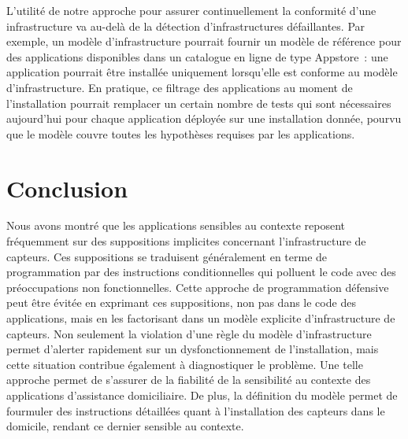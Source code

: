L'utilité de notre approche pour assurer continuellement la conformité d'une 
infrastructure va au-delà de la détection d'infrastructures défaillantes. 
Par exemple, un modèle d'infrastructure pourrait fournir un modèle de référence pour des applications 
disponibles dans un catalogue en ligne de type Appstore~: une application pourrait 
être installée uniquement lorsqu'elle est conforme au modèle d'infrastructure. 
En pratique, ce filtrage des applications au moment de l'installation pourrait remplacer
un certain nombre de tests qui sont nécessaires aujourd'hui pour chaque application déployée sur une installation
donnée, pourvu que le modèle couvre toutes les hypothèses requises par les applications.

\section{Conclusion}\label{sec:futurework}
Nous avons montré que les applications sensibles au contexte reposent 
fréquemment sur des suppositions implicites concernant l'infrastructure de capteurs. Ces 
suppositions se traduisent généralement en terme de programmation par des instructions conditionnelles qui 
polluent le code avec des préoccupations non fonctionnelles. Cette approche de programmation
défensive peut être évitée en exprimant ces suppositions, non pas dans le code 
des applications, mais en les factorisant dans un modèle explicite 
d'infrastructure de capteurs. Non seulement la violation d'une règle
du modèle d'infrastructure
permet d'alerter rapidement sur un dysfonctionnement de
l'installation, mais cette situation
contribue également à diagnostiquer le problème. 
Une telle approche permet de s'assurer de la fiabilité de la sensibilité au 
contexte des applications d'assistance domiciliaire. De plus, la définition du 
modèle permet de fourmuler des instructions détaillées quant à l'installation 
des capteurs dans le domicile, rendant ce dernier sensible au contexte.



